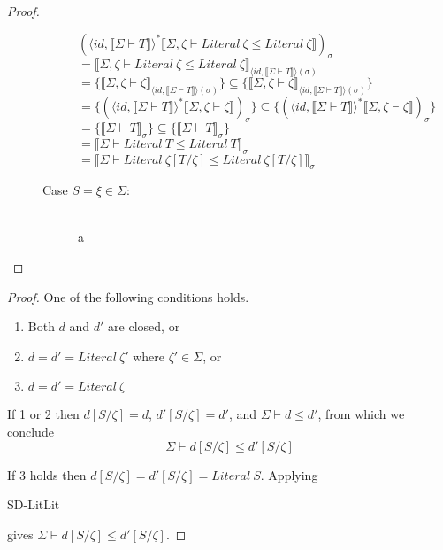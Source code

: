 \documentclass{article}
\newcommand{\sem}[1]{\llbracket #1 \rrbracket}
\begin{document}
\begin{proof}
\begin{description}
\begin{description}
$(\langle \mathit{id},\sem{\Sigma \vdash T} \rangle^* \sem{\Sigma,\zeta \vdash \mathit{Literal}~\zeta \leq \mathit{Literal~\zeta}})_\sigma$\\
$= \sem{\Sigma,\zeta \vdash \mathit{Literal}~\zeta \leq \mathit{Literal}~\zeta}_{\langle \mathit{id}, \sem{\Sigma \vdash T}\rangle(\sigma)}$\\
$= \{ \sem{\Sigma,\zeta \vdash \zeta}_{\langle \mathit{id}, \sem{\Sigma \vdash T}\rangle(\sigma)} \} \subseteq \{ \sem{\Sigma,\zeta \vdash \zeta}_{\langle \mathit{id}, \sem{\Sigma \vdash T}\rangle(\sigma)} \}$\\
$= \{ (\langle \mathit{id}, \sem{\Sigma \vdash T}\rangle^*\sem{\Sigma,\zeta \vdash \zeta})_\sigma \} \subseteq \{ (\langle \mathit{id}, \sem{\Sigma \vdash T}\rangle^*\sem{\Sigma,\zeta \vdash \zeta})_\sigma \}$\\
$= \{ \sem{\Sigma \vdash T}_{\sigma} \} \subseteq \{ \sem{\Sigma \vdash T}_{\sigma} \}$\\
$= \sem{\Sigma \vdash \mathit{Literal}~T \leq \mathit{Literal}~T}_{\sigma}$\\
$= \sem{\Sigma \vdash \mathit{Literal}~\zeta[T/\zeta] \leq \mathit{Literal}~\zeta[T/\zeta]}_{\sigma}$

 
\item[Case $S = \xi \in \Sigma$:]~\\
a

\end{description}


\end{description}

\end{proof}

\begin{proof}
One of the following conditions holds. 
\begin{enumerate}
\item Both $d$ and $d'$ are closed, or
\item $d = d' = \mathit{Literal}~\zeta'$ where $\zeta' \in \Sigma$, or
\item $d = d' = \mathit{Literal}~\zeta$
\end{enumerate}

If 1 or 2 then $d[S/\zeta] = d$, $d'[S/\zeta] = d'$, and $\Sigma \vdash d \leq d'$, from which we conclude 
$$\Sigma \vdash d[S/\zeta] \leq d'[S/\zeta]$$

If 3 holds then $d[S/\zeta] = d'[S/\zeta] = \mathit{Literal}~S$. Applying \begin{sc}SD-LitLit\end{sc} gives
$\Sigma \vdash d[S/\zeta] \leq d'[S/\zeta]$.
\end{proof}
\end{document}
